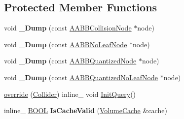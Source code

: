 \subsection*{Protected Member Functions}
\begin{DoxyCompactItemize}
\item 
void {\bfseries \+\_\+\+Dump} (const \hyperlink{classAABBCollisionNode}{A\+A\+B\+B\+Collision\+Node} $\ast$node)\hypertarget{classVolumeCollider_a86f49b913fa453af05812f27a27e5606}{}\label{classVolumeCollider_a86f49b913fa453af05812f27a27e5606}

\item 
void {\bfseries \+\_\+\+Dump} (const \hyperlink{classAABBNoLeafNode}{A\+A\+B\+B\+No\+Leaf\+Node} $\ast$node)\hypertarget{classVolumeCollider_ac9018229b2ce11b4b4cb6004e5cfa1a1}{}\label{classVolumeCollider_ac9018229b2ce11b4b4cb6004e5cfa1a1}

\item 
void {\bfseries \+\_\+\+Dump} (const \hyperlink{classAABBQuantizedNode}{A\+A\+B\+B\+Quantized\+Node} $\ast$node)\hypertarget{classVolumeCollider_a7d1365fd6410315c6b2e851a7532081c}{}\label{classVolumeCollider_a7d1365fd6410315c6b2e851a7532081c}

\item 
void {\bfseries \+\_\+\+Dump} (const \hyperlink{classAABBQuantizedNoLeafNode}{A\+A\+B\+B\+Quantized\+No\+Leaf\+Node} $\ast$node)\hypertarget{classVolumeCollider_a413569222c1d11b0e7fd620003870c3e}{}\label{classVolumeCollider_a413569222c1d11b0e7fd620003870c3e}

\item 
\hyperlink{classVolumeCollider_af4451514a209daf73bb5d99db7d91b73}{override} (\hyperlink{classCollider}{Collider}) inline\+\_\+ void \hyperlink{classCollider_a4ad7ed0314483cf47898290f4ac69081}{Init\+Query}()
\item 
inline\+\_\+ \hyperlink{IceTypes_8h_a050c65e107f0c828f856a231f4b4e788}{B\+O\+OL} {\bfseries Is\+Cache\+Valid} (\hyperlink{structVolumeCache}{Volume\+Cache} \&cache)\hypertarget{classVolumeCollider_a96a9dc6a410daa202784f487d7d73c98}{}\label{classVolumeCollider_a96a9dc6a410daa202784f487d7d73c98}

\end{DoxyCompactItemize}
